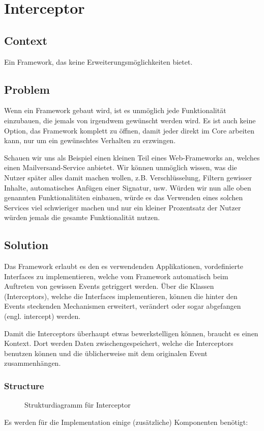 \chapter{Interceptor}

\section{Context}
Ein Framework, das keine Erweiterungsmöglichkeiten bietet.

\section{Problem}
Wenn ein Framework gebaut wird, ist es unmöglich jede Funktionalität einzubauen, die jemals von irgendwem gewünscht werden wird. Es ist auch keine Option, das Framework komplett zu öffnen, damit jeder direkt im Core arbeiten kann, nur um ein gewünschtes Verhalten zu erzwingen.

Schauen wir uns als Beispiel einen kleinen Teil eines Web-Frameworks an, welches einen Mailversand-Service anbietet. Wir können unmöglich wissen, was die Nutzer später alles damit machen wollen, z.B. Verschlüsselung, Filtern gewisser Inhalte, automatisches Anfügen einer Signatur, usw. Würden wir nun alle oben genannten Funktionalitäten einbauen, würde es das Verwenden eines solchen Services viel schwieriger machen und nur ein kleiner Prozentsatz der Nutzer würden jemals die gesamte Funktionalität nutzen.

\section{Solution}
Das Framework erlaubt es den es verwendenden Applikationen, vordefinierte Interfaces zu implementieren, welche vom Framework automatisch beim Auftreten von gewissen Events getriggert werden. Über die Klassen (Interceptors), welche die Interfaces implementieren, können die hinter den Events steckenden Mechanismen erweitert, verändert oder sogar abgefangen (engl. intercept) werden.

Damit die Interceptors überhaupt etwas bewerkstelligen können, braucht es einen Kontext. Dort werden Daten zwischengespeichert, welche die Interceptors benutzen können und die üblicherweise mit dem originalen Event zusammenhängen.

\subsection{Structure}
\begin{figure}[H]
  \centering
  
  \caption{Strukturdiagramm f\"ur Interceptor}
\end{figure}
Es werden für die Implementation einige (zusätzliche) Komponenten benötigt:

